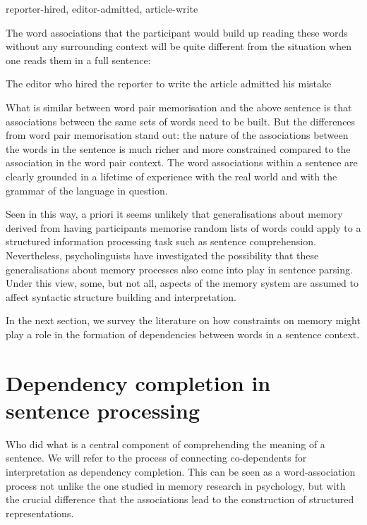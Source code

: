 \documentclass{cambridge7A}\usepackage[]{graphicx}\usepackage[]{color}
\begin{document}
\begin{exe}
\ex
  reporter-hired, editor-admitted, article-write
\end{exe}

The word associations that the participant would build up reading these words without any surrounding context will be quite different from the situation when one reads them in a full sentence:
  
\begin{exe}
\ex
The editor who hired the reporter to write the article admitted his mistake
\end{exe}

What is similar between word pair memorisation and the above sentence is that associations between the same sets of words need to be built. But the differences from word pair memorisation stand out: the nature of the associations  between the words in the sentence is much richer  and more constrained compared to the association in the word pair context.  The word associations  within a sentence are clearly grounded in a lifetime of experience with the real world and  with the grammar of the language in question. 
  
Seen in this way, a priori it seems unlikely that generalisations about memory derived from having participants memorise random lists of words could apply to a structured information processing task such as sentence comprehension.  Nevertheless, psycholinguists have investigated the possibility that these generalisations about memory processes also come into play in sentence parsing.
 Under this view, some, but not all, aspects of the memory system are assumed to affect syntactic structure building  and interpretation.  
 
In the next section, we survey the literature on how constraints on memory might play a role in the formation of dependencies between words in a sentence context. 
 
\section{Dependency completion in sentence processing} 

Who did what is a central component of comprehending the meaning of a sentence. We will refer to the process of connecting co-dependents for interpretation as  dependency completion.  This can be seen as a word-association process not unlike the one studied in memory research in psychology, but with the crucial difference that the associations lead to the construction of structured representations. 
\end{document}
